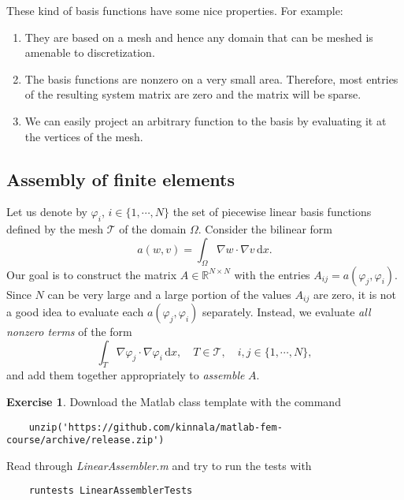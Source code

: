 \documentclass{amsart}
\theoremstyle{definition}
\newtheorem{exercise}{\color{red}Exercise}
\begin{document}
These kind of basis functions have some nice properties.
For example:
\begin{enumerate}
\item They are based on a mesh and hence any domain
  that can be meshed is amenable to discretization.
\item The basis functions are nonzero on a very small area.
  Therefore, most entries of the resulting system matrix are zero
  and the matrix will be sparse.
\item We can easily project an arbitrary function to the
  basis by evaluating it at the vertices of the mesh.
\end{enumerate}

\subsection{Assembly of finite elements}

Let us denote by $\varphi_i$, $i \in \{1, \cdots, N\}$ the set of
piecewise linear basis functions defined by the mesh $\mathcal{T}$
of the domain $\Omega$.
Consider the bilinear form
\begin{equation}
  a(w,v) = \int_\Omega \nabla w \cdot \nabla v\,\mathrm{d}x.
\end{equation}
Our goal is to construct the matrix $A \in \mathbb{R}^{N \times N}$
with the entries $A_{ij} = a(\varphi_j, \varphi_i)$.  Since $N$ can be
very large and a large portion of the values $A_{ij}$ are zero, it is
not a good idea to evaluate each $a(\varphi_j, \varphi_i)$
separately. Instead, we evaluate \emph{all nonzero terms} of the form
\begin{equation}
  \label{eq:integral}
    \int_T \nabla \varphi_j \cdot \nabla \varphi_i\,\mathrm{d}x, \quad T \in \mathcal{T}, \quad i,j \in \{1,\cdots,N\},
\end{equation}
and add them together appropriately to \emph{assemble} $A$.

\begin{exercise}
  Download the Matlab class template with the command
  \begin{lstlisting}
    unzip('https://github.com/kinnala/matlab-fem-course/archive/release.zip')
  \end{lstlisting}
  Read through \emph{LinearAssembler.m} and try to run the tests with
  \begin{lstlisting}
    runtests LinearAssemblerTests
  \end{lstlisting}
\end{exercise}
\end{document}
